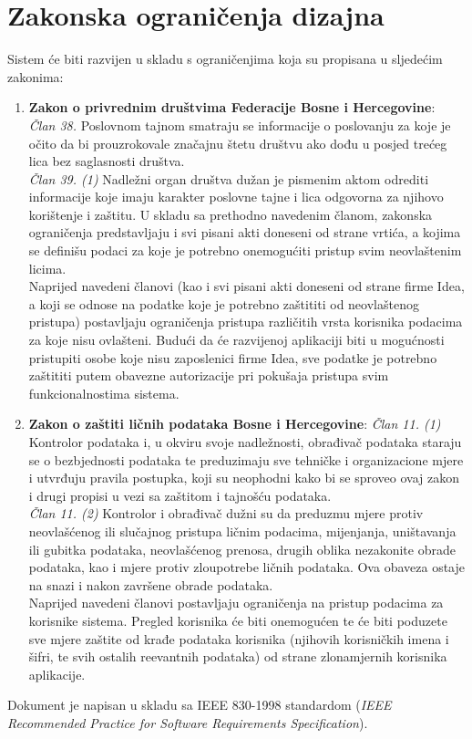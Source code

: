 \documentclass[12pt,a4paper]{article}
\begin{document}
\newpage

\section{Zakonska ograničenja dizajna}

Sistem će biti razvijen u skladu s ograničenjima koja su propisana u sljedećim zakonima:

\begin{enumerate}
\item \textbf{Zakon o privrednim društvima Federacije Bosne i Hercegovine}: \\
\textit{Član 38.} Poslovnom tajnom smatraju se informacije o poslovanju za koje je očito da bi prouzrokovale značajnu štetu društvu ako dođu u posjed trećeg lica bez saglasnosti društva. \\
\textit{Član 39. (1)} Nadležni organ društva dužan je pismenim aktom odrediti informacije koje imaju karakter poslovne tajne i lica odgovorna za njihovo korištenje i zaštitu.
U skladu sa prethodno navedenim članom, zakonska ograničenja predstavljaju i svi pisani akti doneseni od strane vrtića, a kojima se definišu podaci za koje je potrebno onemogućiti pristup svim neovlaštenim licima. \\
Naprijed navedeni članovi (kao i svi pisani akti doneseni od strane firme Idea, a koji se odnose na podatke koje je potrebno zaštititi od neovlaštenog pristupa) postavljaju ograničenja pristupa različitih vrsta korisnika podacima za koje nisu ovlašteni. Budući da će razvijenoj aplikaciji biti u mogućnosti pristupiti osobe koje nisu zaposlenici firme Idea, sve podatke je potrebno zaštititi putem obavezne autorizacije pri pokušaja pristupa svim funkcionalnostima sistema.
\item \textbf{Zakon o zaštiti ličnih podataka Bosne i Hercegovine}:
\textit{Član 11. (1)} Kontrolor podataka i, u okviru svoje nadležnosti, obrađivač podataka staraju se o bezbjednosti podataka te preduzimaju sve tehničke i organizacione mjere i utvrđuju pravila postupka, koji su neophodni kako bi se sproveo ovaj zakon i drugi propisi u vezi sa zaštitom i tajnošću podataka. \\
\textit{Član 11. (2)} Kontrolor i obrađivač dužni su da preduzmu mjere protiv neovlašćenog ili slučajnog pristupa ličnim podacima, mijenjanja, uništavanja ili gubitka podataka, neovlašćenog prenosa, drugih oblika nezakonite obrade podataka, kao i mjere protiv zloupotrebe ličnih podataka. Ova obaveza ostaje na snazi i nakon završene obrade podataka. \\
Naprijed navedeni članovi postavljaju ograničenja na pristup podacima za korisnike sistema. Pregled korisnika će biti onemogućen te će biti poduzete sve mjere zaštite od krađe podataka korisnika (njihovih korisničkih imena i šifri, te svih ostalih reevantnih podataka) od strane zlonamjernih korisnika aplikacije. \\
\end{enumerate}

Dokument je napisan u skladu sa IEEE 830-1998 standardom (\textit{IEEE Recommended Practice for Software Requirements Specification}).
\end{document}
